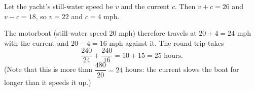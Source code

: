 Let the yacht's still-water speed be $v$ and the current $c$. Then $v+c=26$ and $v-c=18$, so $v=22$ and $c=4$ mph.

The motorboat (still-water speed $20$ mph) therefore travels at $20+4=24$ mph with the current and $20-4=16$ mph against it. The round trip takes
\[
\dfrac{240}{24}+\dfrac{240}{16}=10+15=\boxed{25\text{ hours}}.
\]
(Note that this is more than $\dfrac{480}{20}=24$ hours: the current slows the boat for longer than it speeds it up.)
